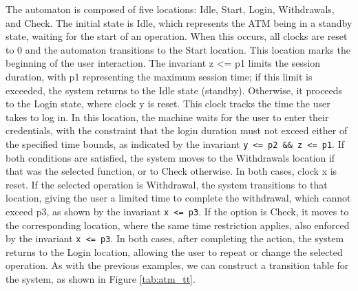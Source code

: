 The automaton is composed of five locations: Idle, Start, Login, Withdrawals, and Check. The initial state is Idle, which represents the ATM being in a standby state, waiting for the start of an operation. When this occurs, all clocks are reset to 0 and the automaton transitions to the Start location. This location marks the beginning of the user interaction. The invariant z <= p1 limits the session duration, with p1 representing the maximum session time; if this limit is exceeded, the system returns to the Idle state (standby). Otherwise, it proceeds to the Login state, where clock y is reset. This clock tracks the time the user takes to log in. In this location, the machine waits for the user to enter their credentials, with the constraint that the login duration must not exceed either of the specified time bounds, as indicated by the invariant \texttt{y <= p2 \&\& z <= p1}. If both conditions are satisfied, the system moves to the Withdrawals location if that was the selected function, or to Check otherwise. In both cases, clock x is reset. If the selected operation is Withdrawal, the system transitions to that location, giving the user a limited time to complete the withdrawal, which cannot exceed p3, as shown by the invariant \texttt{x <= p3}. If the option is Check, it moves to the corresponding location, where the same time restriction applies, also enforced by the invariant \texttt{x <= p3}. In both cases, after completing the action, the system returns to the Login location, allowing the user to repeat or change the selected operation. As with the previous examples, we can construct a transition table for the system, as shown in Figure \ref{tab:atm_tt}.

